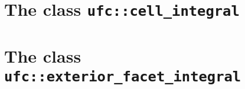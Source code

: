 



\section{The class \texttt{ufc::cell\_integral}}







\section{The class \texttt{ufc::exterior\_facet\_integral}}






